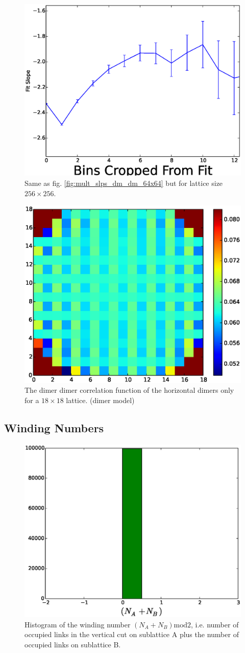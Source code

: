 \documentclass[aps,floatfix,11pt]{revtex4-1}
\begin{document}
\begin{figure}[h]
    \centering
    \includegraphics[width=8.5 cm]{multi_slps_dm_dm_256x256}
    \caption{Same as fig. \ref{fig:mult_slps_dm_dm_64x64} but for lattice size $256\times 256$.
    \label{fig:mult_slps_dm_dm_256x256}}
\end{figure}

\begin{figure}[h]
    \centering
    \includegraphics[width=8.5 cm]{full_lat_dmr_dmr_cor_dmr_dmr_mdl}
    \caption{The dimer dimer correlation function of the horizontal dimers only for a $18\times18$
    lattice. (dimer model)\label{}}
\end{figure}

\subsection{Winding Numbers}

\begin{figure}[h]
    \centering
    \includegraphics[width=8.5 cm]{W_vrt_NApNB_dmr_dmr_mdl}
    \caption{Histogram of the winding number $(N_A + N_B)\mathrm{mod}2$, i.e. number of occupied links in the
    vertical cut on sublattice A plus the number of occupied links on sublattice B.\label{}}
\end{figure}
\end{document}
